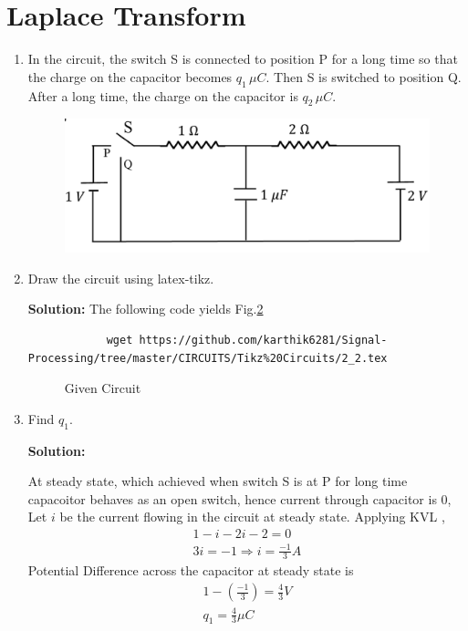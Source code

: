 \documentclass[journal,12pt,twocolumn]{IEEEtran}
\newcommand{\solution}{\noindent \textbf{Solution: }}
\providecommand{\brak}[1]{\ensuremath{\left(#1\right)}}
\numberwithin{equation}{section}
\renewcommand\thesection{\arabic{section}}
\begin{document}
	\section{Laplace Transform}
	\begin{enumerate}[label=\arabic*.,ref=\thesection.\theenumi]
		\item In the circuit, the switch S is connected to position P for a long time so that the charge on the capacitor
		becomes $q_1 \, \mu C$. Then S is switched to position Q.  After a long time, the charge on the capacitor is
		$q_2 \, \mu C$.
		\begin{figure}[!ht]
			\centering
			\includegraphics[width=\columnwidth]{figs/ckt.jpg}
			\caption{}
			\label{fig:ckt}
		\end{figure}
		\item Draw the circuit using latex-tikz.
		
		\solution The following code yields Fig.\ref{fig:qn}
		\begin{lstlisting}
			wget https://github.com/karthik6281/Signal-Processing/tree/master/CIRCUITS/Tikz%20Circuits/2_2.tex
		\end{lstlisting}
		\begin{figure}[!ht]
			\centering
			
			\caption{Given Circuit}
			\label{fig:qn}
		\end{figure}
		
		\item Find $q_1$.
		
		\solution
		
		At steady state, which achieved when switch S is at P for long time capacoitor behaves as an open switch, hence current through capacitor is $0$,
		Let $i$ be the current flowing in the circuit at steady state. Applying KVL ,
		\begin{align}
			1-i-2i-2=0\\
			3i=-1 \Rightarrow i=\frac{-1}{3}A
		\end{align}
		Potential Difference across the capacitor at steady state is
		\begin{align}
			1-\brak{\frac{-1}{3}}=\frac{4}{3}V\\
			q_1=\frac{4}{3} \mu C
		\end{align}
		

\end{enumerate}
\end{document}
